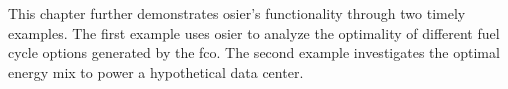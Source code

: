 This chapter further demonstrates \ac{osier}'s functionality through two timely examples. The first example uses \ac{osier} to 
analyze the optimality of different fuel cycle options generated by the \ac{fco}. The second example investigates the optimal
energy mix to power a hypothetical data center.



